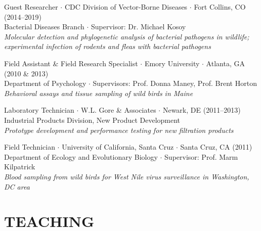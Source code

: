 \documentclass{cv}
\begin{document}
Guest Researcher $\cdot$ CDC Division of Vector-Borne Diseases $\cdot$ Fort Collins, CO (2014--2019) \\
Bacterial Diseases Branch $\cdot$ Supervisor: Dr. Michael Kosoy \\
\textit{Molecular detection and phylogenetic analysis of bacterial pathogens in wildlife; experimental infection of rodents and fleas with bacterial pathogens}

Field Assistant \& Field Research Specialist $\cdot$ Emory University $\cdot$ Atlanta, GA (2010 \& 2013) \\
Department of Psychology $\cdot$ Supervisors: Prof. Donna Maney, Prof. Brent Horton \\
\textit{Behavioral assays and tissue sampling of wild birds in Maine}

Laboratory Technician $\cdot$ W.L. Gore \& Associates $\cdot$ Newark, DE (2011--2013) \\
Industrial Products Division, New Product Development \\
\textit{Prototype development and performance testing for new filtration products}

Field Technician $\cdot$ University of California, Santa Cruz $\cdot$ Santa Cruz, CA (2011) \\
Department of Ecology and Evolutionary Biology $\cdot$ Supervisor: Prof. Marm Kilpatrick \\
\textit{Blood sampling from wild birds for West Nile virus surveillance in Washington, DC area}


\newpage
{}
\parttwo



\section*{TEACHING}

\end{document}
